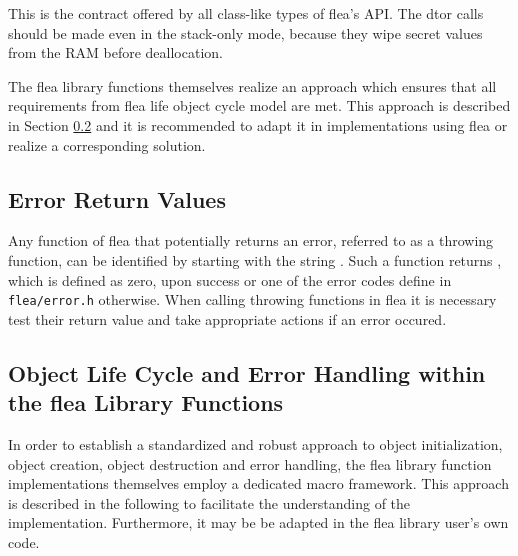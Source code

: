 \documentclass[a4paper,11pt]{scrartcl}
\begin{document}
This is the contract offered by all class-like types of flea's API. The dtor calls should
be made even in the stack-only mode, because they wipe secret values from the
RAM before deallocation.

The flea library functions themselves realize an approach which ensures that all
requirements from flea life object cycle model are met. This approach is
described in Section \ref{fleaFuncSkel} and it is recommended to adapt it in implementations
using flea or realize a corresponding solution.


\subsection{Error Return Values}
\label{secErrRet}
Any function of flea that potentially returns an error, referred to as a throwing function, can be identified by starting with the string
. Such a function returns , which is defined as
zero, upon success or one of the error codes define in \verb#flea/error.h# otherwise.
When calling throwing functions in flea it is necessary test their return value
and take appropriate actions if an error occured.

\subsection{Object Life Cycle and Error Handling within the flea Library Functions}
\label{fleaFuncSkel}
In order to establish a standardized and robust approach to object initialization,
object creation, object destruction and error handling, the flea library
function implementations themselves employ a dedicated macro framework. This
approach is described in the following to facilitate the understanding of the
implementation. Furthermore, it may be be adapted in the flea library user's own
code.
\end{document}
